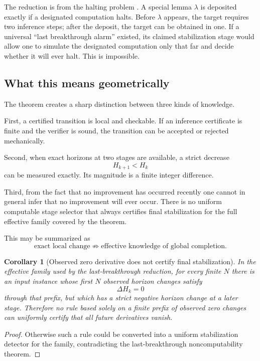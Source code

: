 \documentclass[11pt]{article}
\newtheorem{corollary}[definition]{Corollary}
\theoremstyle{remark}
\begin{document}
The reduction is from the halting problem \cite{Turing1936}. A special lemma $\lambda$ is deposited exactly if a designated computation halts. Before $\lambda$ appears, the target requires two inference steps; after the deposit, the target can be obtained in one. If a universal ``last breakthrough alarm'' existed, its claimed stabilization stage would allow one to simulate the designated computation only that far and decide whether it will ever halt. This is impossible.

\subsection{What this means geometrically}

The theorem creates a sharp distinction between three kinds of knowledge.

First, a certified transition is local and checkable. If an inference certificate is finite and the verifier is sound, the transition can be accepted or rejected mechanically.

Second, when exact horizons at two stages are available, a strict decrease
\[
H_{k+1}<H_k
\]
can be measured exactly. Its magnitude is a finite integer difference.

Third, from the fact that no improvement has occurred recently one cannot in general infer that no improvement will ever occur. There is no uniform computable stage selector that always certifies final stabilization for the full effective family covered by the theorem.

This may be summarized as
\[
\boxed{
\text{exact local change}
\not\Rightarrow
\text{effective knowledge of global completion}.
}
\]

\begin{corollary}[Observed zero derivative does not certify final stabilization]
In the effective family used by the last-breakthrough reduction, for every finite $N$ there is an input instance whose first $N$ observed horizon changes satisfy
\[
\Delta H_k=0
\]
through that prefix, but which has a strict negative horizon change at a later stage. Therefore no rule based solely on a finite prefix of observed zero changes can uniformly certify that all future derivatives vanish.
\end{corollary}

\begin{proof}
Otherwise such a rule could be converted into a uniform stabilization detector for the family, contradicting the last-breakthrough noncomputability theorem.
\end{proof}
\end{document}
